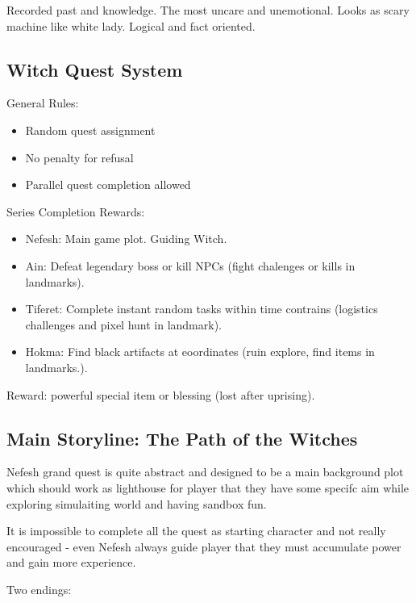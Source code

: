 Recorded past and knowledge. The most uncare and unemotional. Looks as scary machine like white lady. Logical and fact oriented.



\subsection{Witch Quest System}

General Rules:

\begin{itemize}
\item Random quest assignment
\item No penalty for refusal
\item Parallel quest completion allowed
\end{itemize}

Series Completion Rewards:

\begin{itemize}
\item Nefesh: Main game plot. Guiding Witch.
\item Ain: Defeat legendary boss or kill NPCs (fight chalenges or kills in landmarks).
\item Tiferet: Complete instant random tasks within time contrains (logistics challenges and pixel hunt in landmark).
\item Hokma: Find black artifacts at eoordinates (ruin explore, find items in landmarks.).
\end{itemize}

Reward: powerful special item or blessing (lost after uprising).



\subsection{Main Storyline: The Path of the Witches}

Nefesh grand quest is quite abstract and designed to be a main background plot which should work as lighthouse for player that they have some specifc aim while exploring simulaiting world and having sandbox fun.

It is impossible to complete all the quest as starting character and not really encouraged - even Nefesh always guide player that they must accumulate power and gain more experience.

Two endings:

